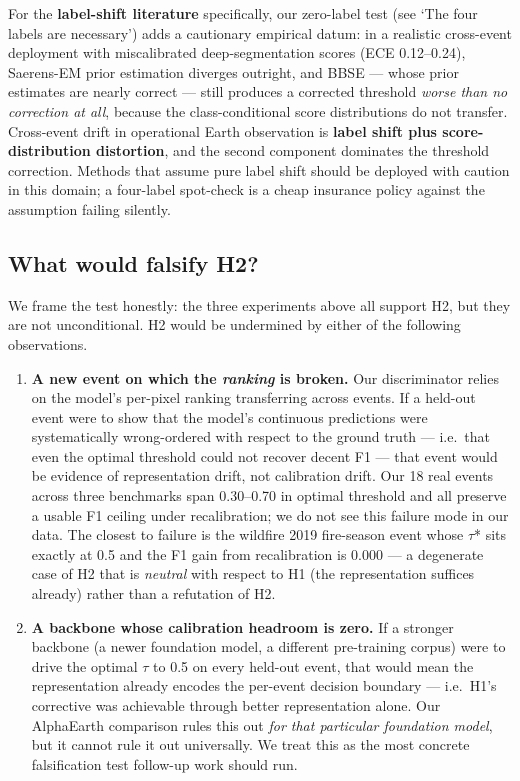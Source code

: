 For the \textbf{label-shift literature} specifically, our zero-label test
(see `The four labels are necessary') adds a cautionary empirical datum: in a realistic cross-event
deployment with miscalibrated deep-segmentation scores (ECE
0.12--0.24), Saerens-EM prior estimation diverges outright, and BBSE ---
whose prior estimates are nearly correct --- still produces a corrected
threshold \emph{worse than no correction at all}, because the
class-conditional score distributions do not transfer. Cross-event
drift in operational Earth observation is \textbf{label shift plus score-
distribution distortion}, and the second component dominates the
threshold correction. Methods that assume pure label shift should be
deployed with caution in this domain; a four-label spot-check is a
cheap insurance policy against the assumption failing silently.

\subsection{What would falsify H2?}\label{what-would-falsify-h2}

We frame the test honestly: the three experiments above all support H2,
but they are not unconditional. H2 would be undermined by either of
the following observations.

\begin{enumerate}
\def\labelenumi{(\roman{enumi})}
\item
  \textbf{A new event on which the \emph{ranking} is broken.} Our discriminator
  relies on the model's per-pixel ranking transferring across events.
  If a held-out event were to show that the model's continuous predictions
  were systematically wrong-ordered with respect to the ground truth ---
  i.e.~that even the optimal threshold could not recover decent F1 --- that
  event would be evidence of representation drift, not calibration drift.
  Our 18 real events across three benchmarks span 0.30--0.70 in optimal
  threshold and all preserve a usable F1 ceiling under recalibration; we
  do not see this failure mode in our data. The closest to failure is
  the wildfire 2019 fire-season event whose $\tau$* sits exactly at 0.5 and
  the F1 gain from recalibration is 0.000 --- a degenerate case of H2 that
  is \emph{neutral} with respect to H1 (the representation suffices already)
  rather than a refutation of H2.
\item
  \textbf{A backbone whose calibration headroom is zero.} If a stronger
  backbone (a newer foundation model, a different pre-training corpus)
  were to drive the optimal $\tau$ to 0.5 on every held-out event, that would
  mean the representation already encodes the per-event decision
  boundary --- i.e.~H1's corrective was achievable through better
  representation alone. Our AlphaEarth comparison rules this out \emph{for
  that particular foundation model}, but it cannot rule it out
  universally. We treat this as the most concrete falsification test
  follow-up work should run.
\end{enumerate}

